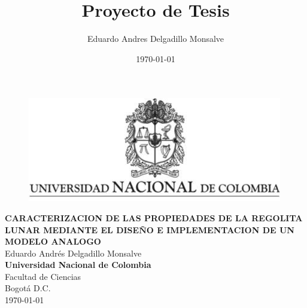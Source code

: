 \documentclass[12pt]{article}
\title{Proyecto de Tesis}
\author{Eduardo Andres Delgadillo Monsalve}
\date{\today}
\begin{document}
\renewcommand{\tablename}{Tabla}%
\renewcommand{\listtablename}{Índice de tablas}
\begin{titlepage}
    \centering
    \thispagestyle{empty}
    \begin{center}
        \begin{figure}
        \centering%
        \includegraphics{images/EscudoUN.png}
    \end{figure}
    
    \vspace{3cm}
    
        \textbf{CARACTERIZACION DE LAS PROPIEDADES DE LA REGOLITA LUNAR MEDIANTE EL DISEÑO E IMPLEMENTACION DE UN MODELO ANALOGO}\\[2in]    
    Eduardo Andrés Delgadillo Monsalve \\  [3in]

   \textbf{Universidad Nacional de Colombia}\\
   Facultad de Ciencias\\
   Bogotá D.C.\\
   \today
    \end{center}
\end{titlepage}
\end{document}
